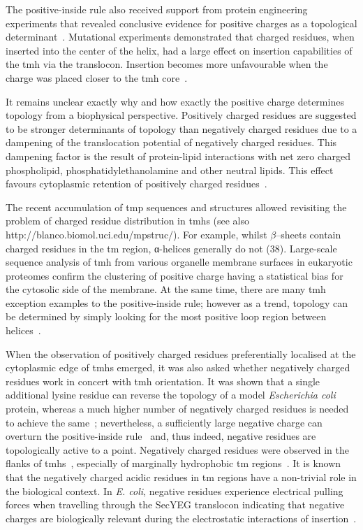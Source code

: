 The positive-inside rule also received support from protein engineering experiments that revealed conclusive evidence for positive charges as a topological determinant~\cite{VonHeijne1989, Beltzer1991, Kida2006, Nilsson1990}. Mutational experiments demonstrated that charged residues, when inserted into the center of the helix, had a large effect on insertion capabilities of the \gls{tmh} via the translocon. Insertion becomes more unfavourable when the charge was placed closer to the \gls{tmh} core~\cite{Hessa2005}.

It remains unclear exactly why and how exactly the positive charge determines topology from a biophysical perspective. Positively charged residues are suggested to be stronger determinants of topology than negatively charged residues due to a dampening of the translocation potential of negatively charged residues. This dampening factor is the result of protein-lipid interactions with net zero charged phospholipid, phosphatidylethanolamine and other neutral lipids. This effect favours cytoplasmic retention of positively charged residues~\cite{Bogdanov2014}.

The recent accumulation of \gls{tmp} sequences and structures allowed revisiting the problem of charged residue distribution in \gls{tmh}s (see also http://blanco.biomol.uci.edu/mpstruc/). For example, whilst \(\beta\)--sheets contain charged residues in the \gls{tm} region, α-helices generally do not (38). Large-scale sequence analysis of \gls{tmh} from various organelle membrane surfaces in eukaryotic proteomes confirm the clustering of positive charge having a statistical bias for the cytosolic side of the membrane. At the same time, there are many \gls{tmh} exception examples to the positive-inside rule; however as a trend, topology can be determined by simply looking for the most positive loop region between helices~\cite{Sharpe2010, Baeza-Delgado2013}.

When the observation of positively charged residues preferentially localised at the cytoplasmic edge of \gls{tmh}s emerged, it was also asked whether negatively charged residues work in concert with \gls{tmh} orientation. It was shown that a single additional lysine residue can reverse the topology of a model \textit{Escherichia coli} protein, whereas a much higher number of negatively charged residues is needed to achieve the same~\cite{Nillson1990}; nevertheless, a sufficiently large negative charge can overturn the positive-inside rule~\cite{Andersson1993, Kim1994} and, thus indeed, negative residues are topologically active to a point. Negatively charged residues were observed in the flanks of \gls{tmh}s~\cite{Baeza-Delgado2013}, especially of marginally hydrophobic \gls{tm} regions~\cite{Delgado-Partin1998}. It is known that the negatively charged acidic residues in \gls{tm} regions have a non-trivial role in the biological context. In \textit{E. coli}, negative residues experience electrical pulling forces when travelling through the SecYEG translocon indicating that negative charges are biologically relevant during the electrostatic interactions of insertion~\cite{Ismail2012, Ismail2015}.

